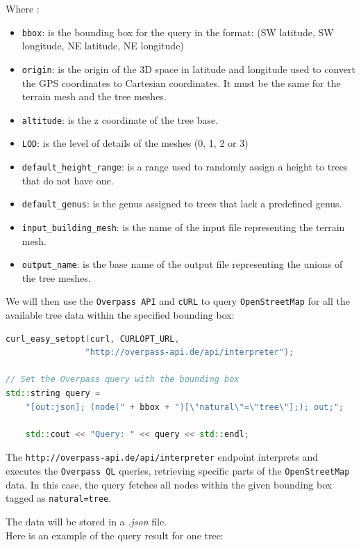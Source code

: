 \documentclass[12pt]{article}
\begin{document}
Where :
\begin{itemize}
    \item \texttt{bbox}: is the bounding box for the query in the format:
    \subitem (SW latitude, SW longitude, NE latitude, NE longitude)
    \item \texttt{origin}: is the origin of the 3D space in latitude and longitude
    used to convert the GPS coordinates to Cartesian coordinates. It must be the
    same for the terrain mesh and the tree meshes.
    \item \texttt{altitude}: is the z coordinate of the tree base.
    \item \texttt{LOD}: is the level of details of the meshes (0, 1, 2 or 3)
    \item \texttt{default\_height\_range}: is a range used to randomly assign a
    height to trees that do not have one.
    \item \texttt{default\_genus}: is the genus assigned to trees that lack a
    predefined genus.
    \item \texttt{input\_building\_mesh}: is the name of the input file
    representing the terrain mesh.
    \item \texttt{output\_name}: is the base name of the output file
    representing the unions of the tree meshes.
\end{itemize}

We will then use the \texttt{Overpass API} and \texttt{cURL} to query
\texttt{OpenStreetMap} for all the available tree data within the specified
bounding box:

\begin{lstlisting}[language=C++]
curl_easy_setopt(curl, CURLOPT_URL,
                "http://overpass-api.de/api/interpreter");

// Set the Overpass query with the bounding box
std::string query =
    "[out:json]; (node(" + bbox + ")[\"natural\"=\"tree\"];); out;";

    std::cout << "Query: " << query << std::endl;
\end{lstlisting}

The \texttt{http://overpass-api.de/api/interpreter} endpoint interprets and
executes the \texttt{Overpass QL}\cite{overpass-ql} queries, retrieving
specific parts of the \texttt{OpenStreetMap} data. In this case, the query
fetches all nodes within the given bounding box tagged as \texttt{natural=tree}.

The data will be stored in a \textit{.json} file. \\
Here is an example of the query result for one tree:
\end{document}
